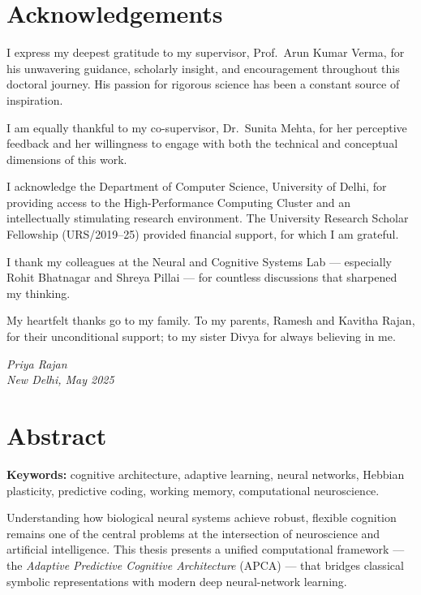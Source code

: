 \documentclass[12pt, a4paper, oneside]{report}
\theoremstyle{definition}
\theoremstyle{remark}
\newcommand{\thesissupervisor}{Prof.\ Arun Kumar Verma}
\newcommand{\thesiscosupervisor}{Dr.\ Sunita Mehta}
\newcommand{\thesisyear}{2025}
\newcommand{\submissionmonth}{May \thesisyear}
\begin{document}
\chapter*{Acknowledgements}
\thispagestyle{plain}

I express my deepest gratitude to my supervisor, \thesissupervisor, for his unwavering
guidance, scholarly insight, and encouragement throughout this doctoral journey. His
passion for rigorous science has been a constant source of inspiration.

\medskip
I am equally thankful to my co-supervisor, \thesiscosupervisor, for her perceptive
feedback and her willingness to engage with both the technical and conceptual dimensions
of this work.

\medskip
I acknowledge the Department of Computer Science, University of Delhi, for providing
access to the High-Performance Computing Cluster and an intellectually stimulating
research environment. The University Research Scholar Fellowship (URS/2019--25) provided
financial support, for which I am grateful.

\medskip
I thank my colleagues at the Neural and Cognitive Systems Lab --- especially
Rohit Bhatnagar and Shreya Pillai --- for countless discussions that sharpened my thinking.

\medskip
My heartfelt thanks go to my family. To my parents, Ramesh and Kavitha Rajan, for their
unconditional support; to my sister Divya for always believing in me.

\vspace{1cm}
\begin{flushright}
  \textit{Priya Rajan}\\
  \textit{New Delhi, \submissionmonth}
\end{flushright}

\chapter*{Abstract}
\thispagestyle{plain}

\noindent\textbf{Keywords:} cognitive architecture, adaptive learning, neural networks,
Hebbian plasticity, predictive coding, working memory, computational neuroscience.

\bigskip
Understanding how biological neural systems achieve robust, flexible cognition remains one
of the central problems at the intersection of neuroscience and artificial intelligence.
This thesis presents a unified computational framework --- the \textit{Adaptive Predictive
Cognitive Architecture} (APCA) --- that bridges classical symbolic representations with
modern deep neural-network learning.
\end{document}
